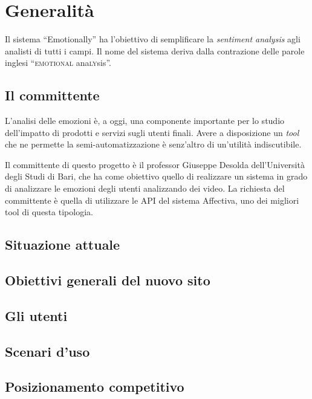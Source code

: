 
\chapter{Generalità}\label{chap:generalita}

Il sistema ``Emotionally'' ha l'obiettivo di semplificare la \textit{sentiment
analysis} agli analisti di tutti i campi. Il nome del sistema deriva dalla
contrazione delle parole inglesi ``\textsc{emotional} ana\textsc{ly}sis''.

\section{Il committente}\label{sec:il-committente}

L'analisi delle emozioni è, a oggi, una componente importante per lo studio
dell'impatto di prodotti e servizi sugli utenti finali. Avere a disposizione un
\textit{tool} che ne permette la semi-automatizzazione è senz'altro di
un'utilità indiscutibile.

Il committente di questo progetto è il professor Giuseppe Desolda
dell'Università degli Studi di Bari, che ha come obiettivo quello di realizzare
un sistema in grado di analizzare le emozioni degli utenti analizzando dei
video. La richiesta del committente è quella di utilizzare le API del sistema
Affectiva, uno dei migliori tool di questa tipologia.

\section{Situazione attuale}\label{sec:situazione-attuale}

\section{Obiettivi generali del nuovo sito}\label{sec:obiettivi-generali-del-nuovo-sito}

\section{Gli utenti}\label{sec:gli-utenti}

\section{Scenari d'uso}\label{sec:scenari-duso}

\section{Posizionamento competitivo}\label{sec:posizionamento-competitivo}
